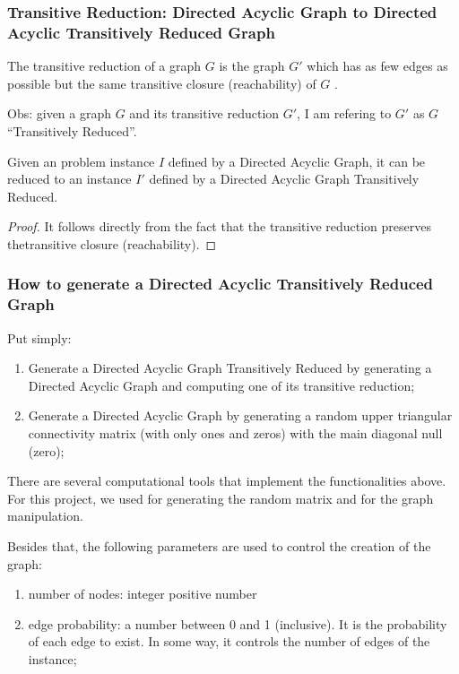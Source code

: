 \subsubsection{Transitive Reduction: Directed Acyclic Graph to Directed Acyclic Transitively Reduced Graph}

\begin{defn}
    The transitive reduction of a graph $G$ is the graph $G'$ which has as few edges as possible but the same transitive closure (reachability) of $G$ \cite{bib:transitive-reduction}.
\end{defn}

Obs: given a graph $G$ and its transitive reduction $G'$, I am refering to $G'$ as $G$ ``Transitively Reduced''.

\begin{lemma}
    \label{lemma:reduction-2}
    Given an problem instance $I$ defined by a Directed Acyclic Graph, it can be reduced to an instance $I'$ defined by a Directed Acyclic Graph Transitively Reduced.
\end{lemma}

\begin{proof}
    It follows directly from the fact that the transitive reduction preserves thetransitive closure (reachability).
\end{proof}

\subsubsection{How to generate a Directed Acyclic Transitively Reduced Graph}

Put simply:

\begin{enumerate}
    \item Generate a Directed Acyclic Graph Transitively Reduced by generating a Directed Acyclic Graph and computing one of its transitive reduction;
    \item Generate a Directed Acyclic Graph by generating a random upper triangular connectivity matrix (with only ones and zeros) with the main diagonal null (zero);
\end{enumerate}

There are several computational tools that implement the functionalities above. For this project, we used \cite{bib:numpy} for generating the random matrix and \cite{bib:networkx} for the graph manipulation.

Besides that, the following parameters are used to control the creation of the graph:

\begin{enumerate}
    \item number of nodes: integer positive number
    \item edge probability: a number between 0 and 1 (inclusive). It is the probability of each edge to exist. In some way, it controls the number of edges of the instance;
\end{enumerate}
